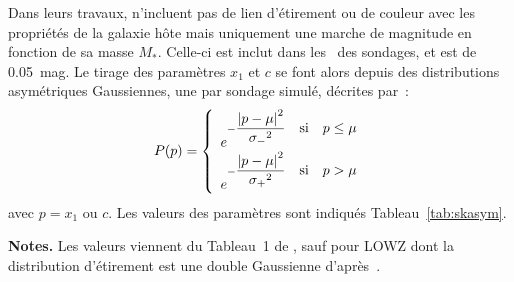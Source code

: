\documentclass[../main/main.tex]{subfiles}
\begin{document}
Dans leurs travaux,  n'incluent pas de lien d'étirement
ou de couleur avec les propriétés de la galaxie hôte mais uniquement une marche
de magnitude en fonction de sa masse $M_*$. Celle-ci est inclut dans les
\wgtmap\ des sondages, et est de \SI{0.05}{mag}. Le tirage des paramètres $x_1$
et $c$ se font alors depuis des distributions asymétriques Gaussiennes, une par
sondage simulé, décrites par~:
\begin{equation}\label{eq:skasym}
    P(p) = \left\{
        \begin{array}{l}
            e^{-\displaystyle\frac{\abs{p-\mu}^2}{\sigma_-{}^2}
                \quad\text{si}\quad p\leq\mu} \\
            e^{-\displaystyle\frac{\abs{p-\mu}^2}{\sigma_+{}^2}
                \quad\text{si}\quad p>\mu} \\
        \end{array}
        \right.
\end{equation}
avec $p = x_1$ ou $c$. Les valeurs des paramètres sont indiqués
Tableau~\ref{tab:skasym}.

\begin{table}[h]
    \centering
        \caption[Paramètres des distributions d'étirement et de couleur pour les
        simulations SK]{Paramètres des distributions sous-jacentes d'étirement
            et de couleur desquelles sont générées les SNe~Ia dans notre
        reproduction du travail de .}
        \label{tab:skasym}
    \begin{threeparttable}
        \begin{tablenotes}[flushleft]
        \item\small \textbf{\hspace{-3,2pt}Notes.} Les valeurs viennent du
            Tableau~1 de , sauf pour LOWZ dont la
            distribution d'étirement est une double Gaussienne
            d'après~\cite{scolnic2018}.
        \end{tablenotes}
    \end{threeparttable}
\end{table}
\end{document}
